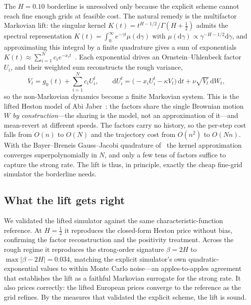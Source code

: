 \documentclass{ws-ijtaf}
\begin{document}
The $H=0.10$ borderline is unresolved only because the explicit scheme cannot reach fine
enough grids at feasible cost. The natural remedy is the multifactor Markovian lift: the
singular kernel $K(t)=t^{H-1/2}/\Gamma(H+\tfrac12)$ admits the spectral representation
$K(t)=\int_0^\infty e^{-\gamma t}\mu(\mathrm{d}\gamma)$ with
$\mu(\mathrm{d}\gamma)\propto \gamma^{-H-1/2}\mathrm{d}\gamma$, and approximating this
integral by a finite quadrature gives a sum of exponentials
$K(t)\approx\sum_{i=1}^N c_i e^{-x_i t}$~\citep{ak2024}. Each exponential drives an Ornstein--Uhlenbeck
factor $U_i$, and their weighted sum reconstructs the rough variance,
\begin{equation}
V_t = g_0(t) + \sum_{i=1}^N c_i U_i^t,
\qquad
\mathrm{d}U_i^t = \big(-x_i U_i^t - \kappa V_t\big)\,\mathrm{d}t
                 + \nu\sqrt{V_t}\,\mathrm{d}W_t,
\end{equation}
so the non-Markovian dynamics become a finite Markovian system. This is the lifted
Heston model of Abi Jaber~\citeyearpar{aj2019}: the factors share the single Brownian motion
$W$ \emph{by construction}---the sharing is the model, not an approximation of it---and
mean-revert at different speeds. The factors carry no
history, so the per-step cost falls from $O(n)$ to $O(N)$ and the trajectory cost from
$O(n^2)$ to $O(Nn)$. With the Bayer--Breneis Gauss--Jacobi quadrature of~\citet{bbf2023} the kernel approximation
converges superpolynomially in $N$, and only a few tens of factors suffice to capture the
strong rate. The lift is thus, in principle, exactly the cheap fine-grid simulator the
borderline needs.

\subsection{What the lift gets right}

We validated the lifted simulator against the same characteristic-function reference. At
$H=\tfrac12$ it reproduces the closed-form Heston price without bias, confirming the factor
reconstruction and the positivity treatment. Across the rough regime it reproduces the
strong-order signature $\beta=2H$ to $\max|\beta-2H|=0.034$, matching the explicit
simulator's own quadratic-exponential values to within Monte Carlo noise---an
apples-to-apples agreement that establishes the lift as a faithful Markovian surrogate for
the strong rate. It also prices correctly: the lifted European prices converge to the
reference as the grid refines. By the measures that validated the explicit scheme, the lift
is sound.
\end{document}
